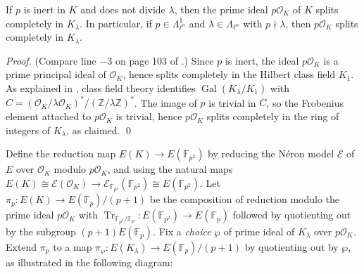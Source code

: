 \documentclass{oupau}
\DeclareMathOperator{\Gal}{Gal}
\DeclareMathOperator{\Tr}{Tr}
\newcommand{\isom}{\cong}
\newcommand{\FF}{\mathbb{F}}
\newcommand{\OO}{\mathcal{O}}
\newcommand{\ZZ}{\mathbb{Z}}
\begin{document}
\begin{lemma}\label{lem:splits}
  If $p$ is inert in $K$ and does not divide $\lambda$, then the prime
  ideal $p\OO_K$ of $K$ splits completely in $K_{\lambda}$.  In
  particular, if $p\in \Lambda^1_{\ell^n}$ and $\lambda \in
  \Lambda_{\ell^n}$ with $p\nmid \lambda$, then $p\OO_K$ splits
  completely in $K_{\lambda}$.
\end{lemma}
\begin{proof}
(Compare line $-3$ on page 103 of \cite{kolyvagin:structureofsha}.)
Since $p$ is inert, the ideal $p\OO_K$ is a prime principal ideal
of $\OO_K$, hence splits completely in the Hilbert class field $K_1$.
As explained in \cite[pg.~238]{gross:kolyvagin}, class field theory
identifies $\Gal(K_{\lambda}/K_1)$ with $C = (\OO_K/\lambda\OO_K)^* /
(\ZZ/\lambda\ZZ)^*$.  The image of $p$ is trivial in $C$, so the
Frobenius element attached to $p\OO_K$ is trivial, hence $p\OO_K$
splits completely in the ring of integers of $K_{\lambda}$, as
claimed.  \qed \end{proof}

Define the reduction map $E(K)\to E(\FF_{p^2})$ by reducing the
N\'eron model $\mathcal{E}$ of $E$ over $\OO_K$ modulo $p\OO_K$, and
using the natural maps $E(K)\isom\mathcal{E}(\OO_K) \to
\mathcal{E}_{\FF_{p^2}}(\FF_{p^2}) \isom E(\FF_{p^2})$.  Let $\pi_p:
E(K) \to E(\FF_p)/(p+1)$ be the composition of reduction modulo the
prime ideal $p\OO_K$ with $\Tr_{\FF_{p^2}/\FF_p}:E(\FF_{p^2})\to
E(\FF_p)$ followed by quotienting out by the subgroup $(p+1)E(\FF_p)$.
Fix a {\em choice} $\wp$ of prime ideal of $K_{\lambda}$ over
$p\OO_K$.  Extend $\pi_p$ to a map $\pi_{\wp} : E(K_{\lambda}) \to
E(\FF_{p})/(p+1)$ by quotienting out by $\wp$, as illustrated in the
following diagram:
\end{document}
